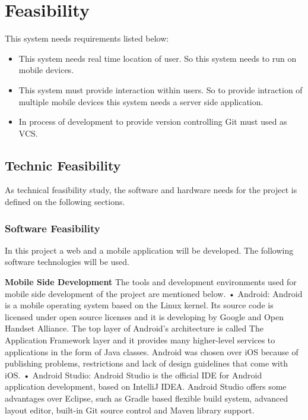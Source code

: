 \chapter{Feasibility}
This system needs requirements listed below:
\begin{itemize}
    \item This system needs real time location of user. So this system needs to run on mobile devices.
    \item This system must provide interaction within users. So to provide intraction of multiple mobile devices this system needs a server side application.
    \item In process of development to provide version controlling Git must used as VCS.
\end{itemize}

\section{Technic Feasibility}
As technical feasibility study, the software and hardware needs for the project is defined on the following sections.
\subsection{Software Feasibility}

In this project a web and a mobile application will be developed. The following software
technologies will be used.

\textbf{Mobile Side Development}
\newline
The tools and development environments used for mobile side development of the
project are mentioned below.
\newline
\newline
• Android: Android is a mobile operating system based on the Linux kernel. Its
source code is licensed under open source licenses and it is developing by Google
and Open Handset Alliance. The top layer of Android’s architecture is called
The Application Framework layer and it provides many higher-level services to
applications in the form of Java classes. Android was chosen over iOS because
of publishing problems, restrictions and lack of design guidelines that come with
iOS\cite{android}.
\newline
• Android Studio: Android Studio is the official IDE for Android application
development, based on IntelliJ IDEA. Android Studio offers some advantages
over Eclipse, such as Gradle based flexible build system, advanced layout editor,
built-in Git source control and Maven library support\cite{androidStudio}.
\newline

